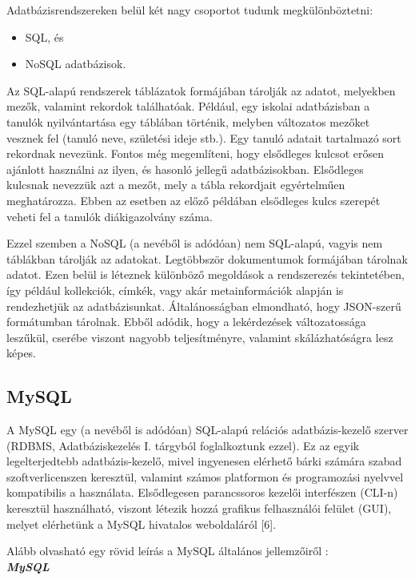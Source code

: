 
Adatbázisrendszereken belül két nagy csoportot tudunk megkülönböztetni:
\begin{itemize}
\item SQL, és
\item NoSQL adatbázisok.
\end{itemize}
Az SQL-alapú rendszerek táblázatok formájában tárolják az adatot, melyekben mezők, valamint rekordok találhatóak. Például, egy iskolai adatbázisban a tanulók nyilvántartása egy táblában történik, melyben változatos mezőket vesznek fel (tanuló neve, születési ideje stb.). Egy tanuló adatait tartalmazó sort rekordnak nevezünk. Fontos még megemlíteni, hogy elsődleges kulcsot erősen ajánlott használni az ilyen, és hasonló jellegű adatbázisokban. Elsődleges kulcsnak nevezzük azt a mezőt, mely a tábla rekordjait egyértelműen meghatározza. Ebben az esetben az előző példában elsődleges kulcs szerepét veheti fel a tanulók diákigazolvány száma.

Ezzel szemben a NoSQL (a nevéből is adódóan) nem SQL-alapú, vagyis nem táblákban tárolják az adatokat. Legtöbbször dokumentumok formájában tárolnak adatot. Ezen belül is léteznek különböző megoldások a rendszerezés tekintetében, így például kollekciók, címkék, vagy akár metainformációk alapján is rendezhetjük az adatbázisunkat. Általánosságban elmondható, hogy JSON-szerű formátumban tárolnak. Ebből adódik, hogy a lekérdezések változatossága leszűkül, cserébe viszont nagyobb teljesítményre, valamint skálázhatóságra lesz képes.

\subsection{MySQL}

A MySQL egy (a nevéből is adódóan) SQL-alapú relációs adatbázis-kezelő szerver (RDBMS, Adatbáziskezelés I. tárgyból foglalkoztunk ezzel).
Ez az egyik legelterjedtebb adatbázis-kezelő, mivel ingyenesen elérhető bárki számára szabad szoftverlicenszen keresztül, valamint számos platformon és programozási nyelvvel kompatibilis a használata.
Elsődlegesen parancssoros kezelői interfészen (CLI-n) keresztül használható, viszont létezik hozzá grafikus felhasználói felület (GUI), melyet elérhetünk a MySQL hivatalos weboldaláról [6].

Alább olvasható egy rövid leírás a MySQL általános jellemzőiről :\\

\noindent\textit{\textbf{\large{MySQL}}}\\

